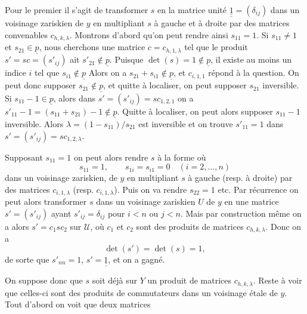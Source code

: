 
Pour le premier il s'agit de transformer \(s\) en la matrice unité \(\underline{\underline{1}}=(\delta_{ij})\) dans un voisinage zariskien de \(y\) en multipliant \(s\) à gauche et à droite par des matrices convenables \(c_{h,k,\lambda}\). Montrons d'abord qu'on peut rendre ainsi \(s_{11}=1\). Si \(s_{11}\ne1\) et \(s_{21}\in\underline{p}\), nous cherchons une matrice \(c=c_{h,1,\lambda}\) tel que le produit \(s'=sc=(s'_{ij})\) ait \(s'_{21}\notin\underline{p}\). Puisque \(\det(s)=1\notin\underline{p}\), il existe au moins un indice \(i\) tel que \(s_{i1}\notin\underline{p}\) Alors on a \(s_{21}+s_{i1}\notin\underline{p}\), et \(c_{i,1,1}\) répond à la question. On peut donc supposer \(s_{21}\notin\underline{p}\), et quitte à localiser, on peut supposer \(s_{21}\) inversible. Si \(s_{11}-1\in\underline{p}\), alors dans \(s'=(s'_{ij})=sc_{1,2,1}\) on a
\(s'_{11}-1=(s_{11}+s_{21})-1\notin\underline{p}\). Quitte à localiser, on peut alors supposer \(s_{11}-1\) inversible. Alors \(\lambda=(1-s_{11})/s_{21}\) est inversible et on trouve \(s'_{11}=1\) dans \(s'=(s'_{ij})=sc_{1,2,\lambda}\).

Supposant \(s_{11}=1\) on peut alors rendre \(s\) à la forme où
\[
 s_{11}=1,\qquad s_{1i}=s_{i1}=0\quad(i=2,\ldots,n)
\]
dans un voisinage zariskien, de \(y\) en multipliant \(s\) à gauche (resp. à droite) par des matrices \(c_{i,1,\lambda}\) (resp. \(c_{i,1,\lambda}\)). Puis on va rendre \(s_{22}=1\) etc. Par récurrence on peut alors transformer \(s\) dans un voisinage zariskien \(U\) de \(y\) en une matrice \(s'=(s'_{ij})\) ayant \(s'_{ij}=\delta_{ij}\) pour \(i<n\) ou \(j<n\). Mais par construction même on a alors \(s'=c_1sc_2\) sur \(\mathcal U\), où \(c_1\) et \(c_2\) sont des produits de matrices \(c_{h,k,\lambda}\). Donc on a
\[
 \det(s')=\det(s)=1,
\]
de sorte que \(s'_{nn}=1\), \(s'=\underline{\underline{1}}\), et on a gagné.

On suppose donc que \(s\) soit déjà sur \(Y\) un produit de matrices \(c_{h,k,\lambda}\).
Reste à voir que celles-ci sont des produits de commutateurs dans un voisinage étale de \(y\). Tout d'abord on voit que deux matrices
